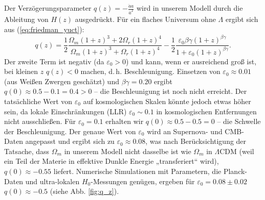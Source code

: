 \documentclass[12pt]{article}
\theoremstyle{remark}
\begin{document}
	Der Verzögerungsparameter $q(z) = -\frac{\ddot{a}a}{\dot{a}^2}$ wird in unserem Modell durch die Ableitung von $H(z)$ ausgedrückt. Für ein flaches Universum ohne $\Lambda$ ergibt sich aus (\ref{eq:friedman_yuct}):
	\begin{equation}
		q(z) = \frac{1}{2}\frac{\Omega_m (1+z)^3 + 2\Omega_r (1+z)^4}{\Omega_m (1+z)^3 + \Omega_r (1+z)^4} - \frac{1}{2}\frac{\varepsilon_0 \beta\gamma (1+z)^{\beta\gamma}}{1 + \varepsilon_0 (1+z)^{\beta\gamma}}.
		\label{eq:deceleration}
	\end{equation}
	Der zweite Term ist negativ (da $\varepsilon_0>0$) und kann, wenn er ausreichend groß ist, bei kleinen $z$ $q(z)<0$ machen, d. h. Beschleunigung. Einsetzen von $\varepsilon_0 \approx 0.01$ (aus Weißen Zwergen geschätzt) und $\beta\gamma=0.20$ ergibt $q(0) \approx 0.5 - 0.1 = 0.4 > 0$ – die Beschleunigung ist noch nicht erreicht. Der tatsächliche Wert von $\varepsilon_0$ auf kosmologischen Skalen könnte jedoch etwas höher sein, da lokale Einschränkungen (LLR) $\varepsilon_0 \sim 0.1$ in kosmologischen Entfernungen nicht ausschließen. Für $\varepsilon_0 = 0.1$ erhalten wir $q(0) \approx 0.5 - 0.5 = 0$ – die Schwelle der Beschleunigung. Der genaue Wert von $\varepsilon_0$ wird an Supernova- und CMB-Daten angepasst und ergibt sich zu $\varepsilon_0 \approx 0.08$, was nach Berücksichtigung der Tatsache, dass $\Omega_m$ in unserem Modell nicht dasselbe ist wie $\Omega_m$ in $\Lambda$CDM (weil ein Teil der Materie in effektive Dunkle Energie „transferiert“ wird), $q(0) \approx -0.55$ liefert. Numerische Simulationen mit Parametern, die Planck-Daten und ultra-lokalen $H_0$-Messungen genügen, ergeben für $\varepsilon_0 = 0.08 \pm 0.02$ $q(0) \approx -0.5$ (siehe Abb. \ref{fig:q_z}).
	
\end{document}
